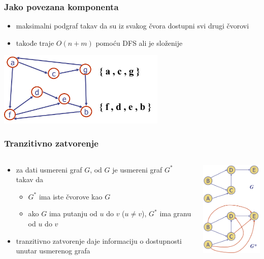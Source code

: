 \documentclass[compress]{beamer}
\begin{document}
\begin{frame}[fragile]
  \frametitle{Jako povezana komponenta}
  \begin{itemize}
    \item maksimalni podgraf takav da su iz svakog čvora dostupni svi
      drugi čvorovi
    \item takođe traje $O(n+m)$ pomoću DFS ali je složenije
  \end{itemize}
  \begin{center}
    \includegraphics[width=8cm]{asp-14-pic34.png}
  \end{center}
\end{frame}

\begin{frame}[fragile]
  \frametitle{Tranzitivno zatvorenje}
  \begin{columns}
    \begin{column}[t]{6cm}
      \begin{itemize}
        \item za dati usmereni graf $G$,  
          od $G$ je usmereni graf $G^{*}$ takav da
        \begin{itemize}
          \item $G^{*}$ ima iste čvorove kao $G$
          \item ako $G$ ima putanju od $u$ do $v$ ($u\neq v$), $G^{*}$ 
            ima granu od $u$ do $v$
        \end{itemize}
        \item tranzitivno zatvorenje daje informaciju o dostupnosti
          unutar usmerenog grafa
      \end{itemize}
    \end{column}
    \begin{column}[t]{6cm}
      \begin{center}
        \includegraphics[width=4cm]{asp-14-pic35.png}
      \end{center}
    \end{column}
  \end{columns}
\end{frame}
\end{document}
